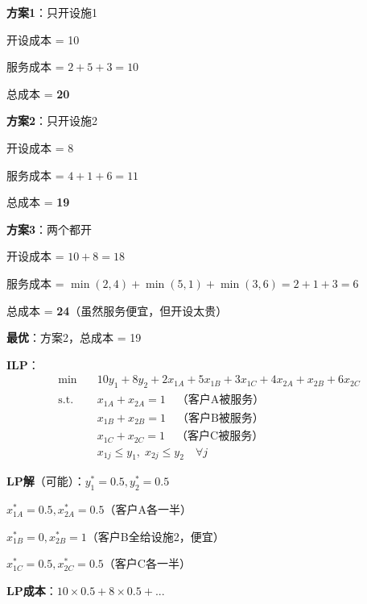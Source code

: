\documentclass[12pt, a4paper]{ctexart}
\begin{document}
\begin{blackboard}

\textbf{方案1}：只开设施1

开设成本 = 10

服务成本 = $2 + 5 + 3 = 10$

总成本 = \textbf{20}

\textbf{方案2}：只开设施2

开设成本 = 8

服务成本 = $4 + 1 + 6 = 11$

总成本 = \textbf{19}

\textbf{方案3}：两个都开

开设成本 = $10 + 8 = 18$

服务成本 = $\min(2,4) + \min(5,1) + \min(3,6) = 2 + 1 + 3 = 6$

总成本 = \textbf{24}（虽然服务便宜，但开设太贵）

\textbf{最优}：方案2，总成本 = 19

\end{blackboard}

\begin{blackboard}

\textbf{ILP}：
\begin{align*}
\min \quad & 10 y_1 + 8 y_2 + 2x_{1A} + 5x_{1B} + 3x_{1C} + 4x_{2A} + x_{2B} + 6x_{2C} \\
\text{s.t.} \quad & x_{1A} + x_{2A} = 1 \quad \text{（客户A被服务）} \\
& x_{1B} + x_{2B} = 1 \quad \text{（客户B被服务）} \\
& x_{1C} + x_{2C} = 1 \quad \text{（客户C被服务）} \\
& x_{1j} \leq y_1, \; x_{2j} \leq y_2 \quad \forall j
\end{align*}

\textbf{LP解}（可能）：$y_1^* = 0.5, y_2^* = 0.5$

$x_{1A}^* = 0.5, x_{2A}^* = 0.5$（客户A各一半）

$x_{1B}^* = 0, x_{2B}^* = 1$（客户B全给设施2，便宜）

$x_{1C}^* = 0.5, x_{2C}^* = 0.5$（客户C各一半）

\textbf{LP成本}：$10 \times 0.5 + 8 \times 0.5 + ...$

\end{blackboard}
\end{document}
